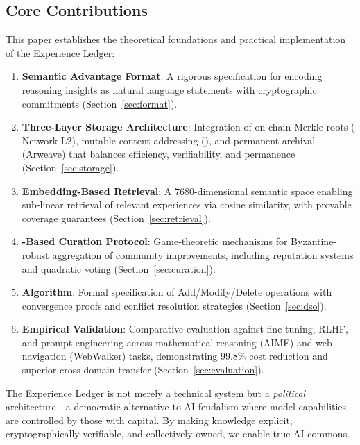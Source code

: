 \subsection{Core Contributions}

This paper establishes the theoretical foundations and practical implementation of the Experience Ledger:

\begin{enumerate}
    \item \textbf{Semantic Advantage Format}: A rigorous specification for encoding reasoning insights as natural language statements with cryptographic commitments (Section~\ref{sec:format}).
    
    \item \textbf{Three-Layer Storage Architecture}: Integration of on-chain Merkle roots (\Zoo{} Network L2), mutable content-addressing (\IPFS{}), and permanent archival (Arweave) that balances efficiency, verifiability, and permanence (Section~\ref{sec:storage}).
    
    \item \textbf{Embedding-Based Retrieval}: A 7680-dimensional semantic space enabling sub-linear retrieval of relevant experiences via cosine similarity, with provable coverage guarantees (Section~\ref{sec:retrieval}).
    
    \item \textbf{\DAO{}-Based Curation Protocol}: Game-theoretic mechanisms for Byzantine-robust aggregation of community improvements, including reputation systems and quadratic voting (Section~\ref{sec:curation}).
    
    \item \textbf{\DSO{} Algorithm}: Formal specification of Add/Modify/Delete operations with convergence proofs and conflict resolution strategies (Section~\ref{sec:dso}).
    
    \item \textbf{Empirical Validation}: Comparative evaluation against fine-tuning, RLHF, and prompt engineering across mathematical reasoning (AIME) and web navigation (WebWalker) tasks, demonstrating 99.8\% cost reduction and superior cross-domain transfer (Section~\ref{sec:evaluation}).
\end{enumerate}

The Experience Ledger is not merely a technical system but a \textit{political} architecture—a democratic alternative to AI feudalism where model capabilities are controlled by those with capital. By making knowledge explicit, cryptographically verifiable, and collectively owned, we enable true AI commons.

